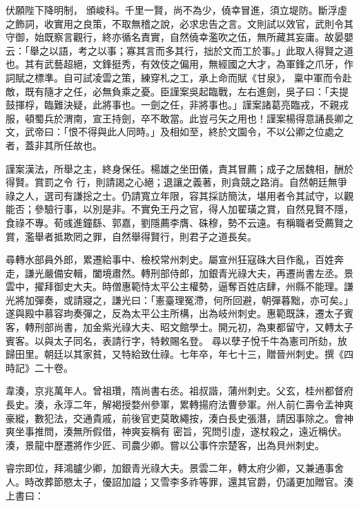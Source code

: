 \begin{pinyinscope}
 伏願陛下降明制，
 頒峻科。千里一賢，尚不為少，僥幸冒進，須立堤防。斷浮虛之飾詞，收實用之良策，不取無稽之說，必求忠告之言。文則試以效官，武則令其守御，始既察言觀行，終亦循名責實，自然僥幸濫吹之伍，無所藏其妄庸。故晏嬰云：「舉之以語，考之以事；寡其言而多其行，拙於文而工於事。」此取人得賢之道也。其有武藝超絕，文鋒挺秀，有效伎之偏用，無經國之大才，為軍鋒之爪牙，作詞賦之標準。自可試凌雲之策，練穿札之工，承上命而賦《甘泉》，
 稟中軍而令赴敵，既有隨才之任，必無負乘之憂。臣謹案吳起臨戰，左右進劍，吳子曰：「夫提鼓揮桴，臨難決疑，此將事也。一劍之任，非將事也。」謹案諸葛亮臨戎，不親戎服，頓蜀兵於渭南，宣王持劍，卒不敢當。此豈弓矢之用也！謹案楊得意誦長卿之文，武帝曰：「恨不得與此人同時。」及相如至，終於文園令，不以公卿之位處之者，蓋非其所任故也。



 謹案漢法，所舉之主，終身保任。楊雄之坐田儀，責其冒薦；成子之居魏相，酬於得賢。賞罰之令
 行，則請謁之心絕；退讓之義著，則貪競之路消。自然朝廷無爭祿之人，選司有謙捴之士。仍請寬立年限，容其採訪簡汰，堪用者令其試守，以觀能否；參驗行事，以別是非。不實免王丹之官，得人加翟璜之賞，自然見賢不隱，食祿不專。荀彧進鐘繇、郭嘉，劉隱薦李膺、硃穆，勢不云遠。有稱職者受薦賢之賞，濫舉者抵欺罔之罪，自然舉得賢行，則君子之道長矣。



 尋轉水部員外郎，累遷給事中、檢校常州刺史。屬宣州狂寇硃大目作亂，百姓奔
 走，謙光嚴備安輯，闔境肅然。轉刑部侍郎，加銀青光祿大夫，再遷尚書左丞。景雲中，擢拜御史大夫。時僧惠範恃太平公主權勢，逼奪百姓店肆，州縣不能理。謙光將加彈奏，或請寢之，謙光曰：「憲臺理冤滯，何所回避，朝彈暮黜，亦可矣。」遂與殿中慕容玽奏彈之，反為太平公主所構，出為岐州刺史。惠範既誅，遷太子賓客，轉刑部尚書，加金紫光祿大夫、昭文館學士。開元初，為東都留守，又轉太子賓客。以與太子同名，表請行字，特敕賜名登。
 尋以孽子悅千牛為憲司所劾，放歸田里。朝廷以其家貧，又特給致仕祿。七年卒，年七十三，贈晉州刺史。撰《四時記》二十卷。



 韋湊，京兆萬年人。曾祖瓚，隋尚書右丞。祖叔諧，蒲州刺史。父玄，桂州都督府長史。湊，永淳二年，解褐授婺州參軍，累轉揚府法曹參軍。州人前仁壽令孟神爽豪縱，數犯法，交通貴戚，前後官吏莫敢繩按，湊白長史張潛，請因事除之。會神爽坐事推問，湊無所假借，神爽妄稱有
 密旨，究問引虛，遂杖殺之，遠近稱伏。湊，景龍中歷遷將作少匠、司農少卿。嘗以公事忤宗楚客，出為貝州刺史。



 睿宗即位，拜鴻臚少卿，加銀青光祿大夫。景雲二年，轉太府少卿，又兼通事舍人。時改葬節愍太子，優詔加謚；又雪李多祚等罪，還其官爵，仍議更加贈官。湊上書曰：




\end{pinyinscope}
